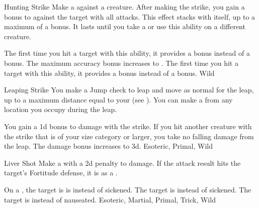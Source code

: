 \lowercase{\hypertarget{maneuver:Hunting Strike}{}}\label{maneuver:Hunting Strike}
\hypertarget{maneuver:Hunting Strike}{}
\begin{freeability}{Hunting Strike}
Make a  against a creature.
After making the strike, you gain a  bonus to  against the target with all attacks.
This effect stacks with itself, up to a maximum of a  bonus.
It lasts until you take a  or use this ability on a different creature.

\rankline
{} The first time you hit a target with this ability, it provides a  bonus instead of a  bonus.
 The maximum accuracy bonus increases to .
 The first time you hit a target with this ability, it provides a  bonus instead of a  bonus.
 Wild
\end{freeability}
\vspace{0.25em}



\lowercase{\hypertarget{maneuver:Leaping Strike}{}}\label{maneuver:Leaping Strike}
\hypertarget{maneuver:Leaping Strike}{}
\begin{freeability}{Leaping Strike}
You make a Jump check to leap and move as normal for the leap, up to a maximum distance equal to your  (see ).
You can make a  from any location you occupy during the leap.

\rankline
{} You gain a \plus1d bonus to damage with the strike.
 If you hit another creature with the strike that is of your size category or larger, you take no falling damage from the leap.
 The damage bonus increases to \plus3d.
 Esoteric, Primal, Wild
\end{freeability}
\vspace{0.25em}



\lowercase{\hypertarget{maneuver:Liver Shot}{}}\label{maneuver:Liver Shot}
\hypertarget{maneuver:Liver Shot}{}
\begin{freeability}{Liver Shot}
Make a  with a \minus2d penalty to damage.
If the attack result hits the target's Fortitude defense,
it is  as a .

\rankline
{} On a , the target is is  instead of sickened.
 The target is  instead of sickened.
 The target is  instead of nauseated.
 Esoteric, Martial, Primal, Trick, Wild
\end{freeability}
\vspace{0.25em}



